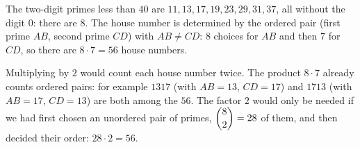 The two-digit primes less than $40$ are $11,13,17,19,23,29,31,37$, all without the digit $0$: there are $8$. The house number is determined by the ordered pair (first prime $AB$, second prime $CD$) with $AB\ne CD$: $8$ choices for $AB$ and then $7$ for $CD$, so there are $8\cdot7=\boxed{56}$ house numbers.

Multiplying by $2$ would count each house number twice. The product $8\cdot7$ already counts ordered pairs: for example $1317$ (with $AB=13$, $CD=17$) and $1713$ (with $AB=17$, $CD=13$) are both among the $56$. The factor $2$ would only be needed if we had first chosen an unordered pair of primes, $\dbinom82=28$ of them, and then decided their order: $28\cdot2=56$.
